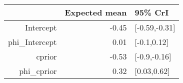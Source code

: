 \begin{tabular}{rrl}
  \hline
 & Expected mean & 95\% CrI \\ 
  \hline
Intercept & -0.45 & [-0.59,-0.31] \\ 
  phi\_Intercept & 0.01 & [-0.1,0.12] \\ 
  cprior & -0.53 & [-0.9,-0.16] \\ 
  phi\_cprior & 0.32 & [0.03,0.62] \\ 
   \hline
\end{tabular}

